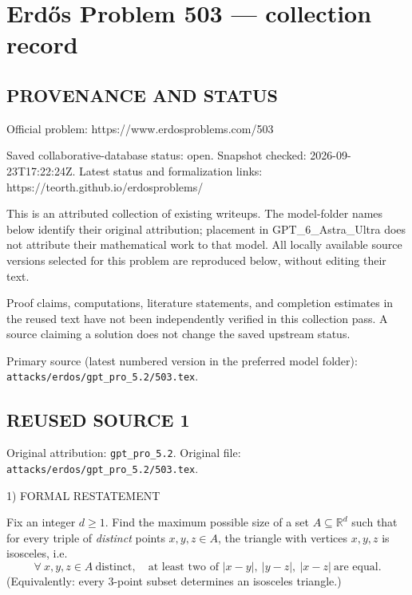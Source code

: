 \section*{Erd\H{o}s Problem 503 --- collection record}

\subsection*{PROVENANCE AND STATUS}
Official problem: https://www.erdosproblems.com/503

Saved collaborative-database status: open.
Snapshot checked: 2026-09-23T17:22:24Z.
Latest status and formalization links: https://teorth.github.io/erdosproblems/

This is an attributed collection of existing writeups. The model-folder names below identify their original attribution; placement in GPT\_6\_Astra\_Ultra does not attribute their mathematical work to that model. All locally available source versions selected for this problem are reproduced below, without editing their text.

Proof claims, computations, literature statements, and completion estimates in the reused text have not been independently verified in this collection pass. A source claiming a solution does not change the saved upstream status.

Primary source (latest numbered version in the preferred model folder): \texttt{attacks/erdos/gpt\_pro\_5.2/503.tex}.

\subsection*{REUSED SOURCE 1}
Original attribution: \texttt{gpt\_pro\_5.2}.
Original file: \texttt{attacks/erdos/gpt\_pro\_5.2/503.tex}.


1) FORMAL RESTATEMENT

Fix an integer $d\ge 1$.
Find the maximum possible size of a set $A\subseteq\mathbb R^d$ such that for every triple of \emph{distinct} points $x,y,z\in A$, the triangle with vertices $x,y,z$ is isosceles, i.e.
\[
\forall\ x,y,z\in A\ \text{distinct},\quad \text{at least two of }\lvert x-y\rvert,\ \lvert y-z\rvert,\ \lvert x-z\rvert\ \text{are equal}.
\]
(Equivalently: every 3-point subset determines an isosceles triangle.)

